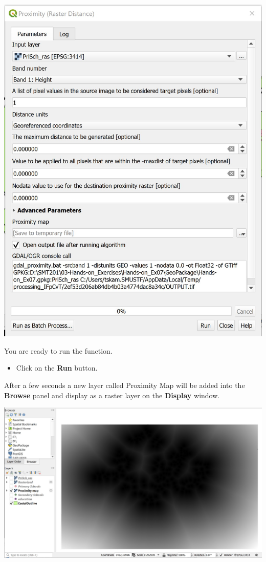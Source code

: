 \documentclass[
  letterpaper,
  DIV=11,
  numbers=noendperiod]{scrreprt}
\providecommand{\tightlist}{%
  \setlength{\itemsep}{0pt}\setlength{\parskip}{0pt}}\usepackage{longtable,booktabs,array}
\begin{document}
\includegraphics{./img06/image13.jpg}

You are ready to run the function.

\begin{itemize}
\tightlist
\item
  Click on the \textbf{Run} button.
\end{itemize}

After a few seconds a new layer called Proximity Map will be added into
the \textbf{Browse} panel and display as a raster layer on the
\textbf{Display} window.

\includegraphics{./img06/image14.jpg}
\end{document}

